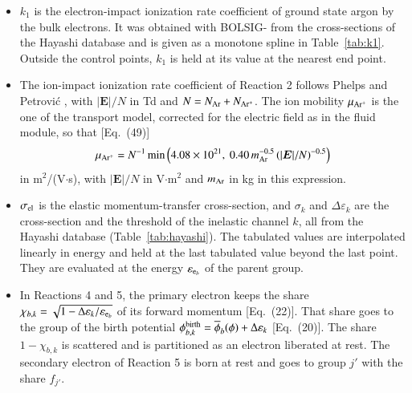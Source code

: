 \documentclass{warpdoc}
\renewcommand{\vec}[1]{\bm{#1}}
\newcommand{\eb}{{\rm e}_b}
\begin{document}
\begin{itemize}
\item $k_1$ is the electron-impact ionization rate coefficient of ground state argon by the bulk electrons. It was obtained with BOLSIG- \cite{psst:2005:hagelaar} from the cross-sections of the Hayashi database \cite{nifs:2003:hayashi,lxcat:hayashi} and is given as a monotone spline in Table~\ref{tab:k1}. Outside the control points, $k_1$ is held at its value at the nearest end point.

\item The ion-impact ionization rate coefficient of Reaction 2 follows Phelps and Petrovi\'c \cite{psst:1999:phelps}, with $|\vec{E}|/N$ in Td and $N=N_{\rm Ar}+N_{\rm Ar^+}$. The ion mobility $\mu_{\rm Ar^+}$ is the one of the transport model, corrected for the electric field as in the fluid module, so that [Eq.~(49)]
$$
\mu_{\rm Ar^+}=N^{-1}\min\left(4.08\times10^{21},\ 0.40\,m_{\rm Ar}^{-0.5}\,(|\vec{E}|/N)^{-0.5}\right)
$$
in m$^2$/(V$\cdot$s), with $|\vec{E}|/N$ in V$\cdot$m$^2$ and $m_{\rm Ar}$ in kg in this expression.

\item $\sigma_{\rm el}$ is the elastic momentum-transfer cross-section, and $\sigma_k$ and $\Delta\varepsilon_k$ are the cross-section and the threshold of the inelastic channel $k$, all from the Hayashi database \cite{nifs:2003:hayashi,lxcat:hayashi} (Table~\ref{tab:hayashi}). The tabulated values are interpolated linearly in energy and held at the last tabulated value beyond the last point. They are evaluated at the energy $\varepsilon_{\eb}$ of the parent group.

\item In Reactions 4 and 5, the primary electron keeps the share $\chi_{b,k}=\sqrt{1-\Delta\varepsilon_k/\varepsilon_{\eb}}$ of its forward momentum [Eq.~(22)]. That share goes to the group of the birth potential $\phi^{\rm birth}_{b,k}=\overline{\phi}_b(\phi)+\Delta\varepsilon_k$ [Eq.~(20)]. The share $1-\chi_{b,k}$ is scattered and is partitioned as an electron liberated at rest. The secondary electron of Reaction 5 is born at rest and goes to group $j'$ with the share $f_{j'}$.


\end{itemize}
\end{document}
